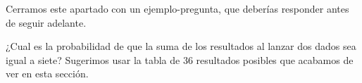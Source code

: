 Cerramos este apartado con un ejemplo-pregunta, que deberías responder antes de seguir adelante.

\begin{Ejemplo}\label{Cap03:ejem:CualEsProbabilidadSumaDosDadosIgualASiete}
    ¿Cual es la probabilidad de que la suma de los resultados al lanzar dos dados sea igual a siete? Sugerimos usar la tabla de 36 resultados posibles que acabamos de ver en esta sección.
\end{Ejemplo}



%




%
%
%
%


